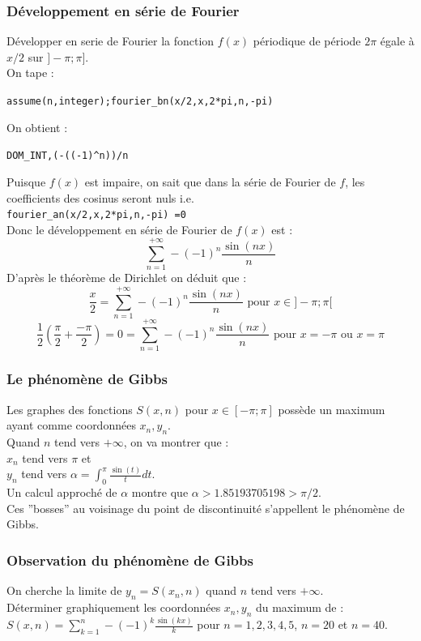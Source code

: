 \documentclass[a4paper,11pt]{book}
\begin{document}
\subsubsection{D\'eveloppement en s\'erie de Fourier}
D\'evelopper en serie de Fourier la fonction $f(x)$ p\'eriodique de 
p\'eriode $2\pi$ \'egale \`a $x/2$ sur $]-\pi;\pi]$.\\
On tape :
\begin{center}{\tt assume(n,integer);fourier\_bn(x/2,x,2*pi,n,-pi)}\end{center}
On obtient :
\begin{center}{\tt DOM\_INT,(-((-1)\verb|^|n))/n}\end{center}
Puisque $f(x)$ est impaire, on sait que dans la s\'erie de Fourier de $f$,
les coefficients des cosinus seront nuls i.e. \\
{\tt fourier\_an(x/2,x,2*pi,n,-pi) =0}\\
Donc le d\'eveloppement en s\'erie de Fourier de $f(x)$ est :
$$\sum_{n=1}^{+\infty}-(-1)^n\frac{\sin(nx)}{n}$$
D'apr\`es le th\'eor\`eme de Dirichlet on d\'eduit que :
$$\frac{x}{2}=\sum_{n=1}^{+\infty}-(-1)^n\frac{\sin(nx)}{n} \mbox{ pour } x\in ]-\pi;\pi[$$
$$\frac{1}{2}(\frac{\pi}{2}+\frac{-\pi}{2})=0=\sum_{n=1}^{+\infty}-(-1)^n\frac{\sin(nx)}{n} \mbox{  pour } x=-\pi \mbox{ ou } x=\pi$$

\subsubsection{Le ph\'enom\`ene de Gibbs}
Les graphes des fonctions $S(x,n)$ pour $x\in [-\pi;\pi]$ poss\`ede un maximum 
ayant comme coordonn\'ees $x_n,y_n$.\\
Quand $n$ tend vers $+\infty$, on va montrer que :\\
 $x_n$ tend vers $\pi$ et\\
$y_n $ tend vers $\displaystyle \alpha=\int_0^\pi \frac{\sin(t)}{t}dt$.\\
Un calcul approch\'e de $\alpha$ montre que  $\alpha>1.85193705198> \pi/2$.\\
Ces ''bosses'' au voisinage du point de discontinuit\'e s'appellent le
ph\'enom\`ene de Gibbs.

\subsubsection{Observation du ph\'enom\`ene de Gibbs}
On cherche la limite de $y_n=S(x_n,n)$ quand $n$ tend vers $+\infty$.\\
D\'eterminer graphiquement les coordonn\'ees $x_n,y_n$ du  maximum de :\\
$S(x,n)=\sum_{k=1}^n -(-1)^k\frac{\sin(kx)}{k}$
pour $n=1, 2, 3, 4, 5$, $n=20$ et $ n=40$.
\end{document}
